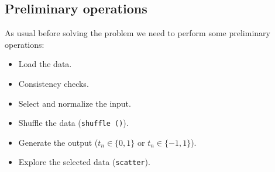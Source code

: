 \subsection{Preliminary operations}
As usual before solving the problem we need to perform some preliminary operations:
\begin{itemize}
    \item Load the data.
    \item Consistency checks.
    \item Select and normalize the input.
    \item Shuffle the data (\texttt{shuffle ()}).
    \item Generate the output ($t_n \in \{0, 1\}$ or $t_n \in \{-1, 1\}$).
    \item Explore the selected data (\texttt{scatter}).
\end{itemize}